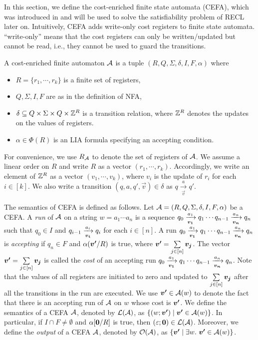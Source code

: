 In this section, we define the cost-enriched finite state automata (CEFA), which was introduced in \cite{atva2020} and will be used to solve the satisfiability problem of RECL later on. 
%
Intuitively, CEFA adds write-only cost registers to finite state automata. ``write-only'' means that the cost registers can only be written/updated but cannot be read, i.e., they cannot be used to guard the transitions. 
%
\begin{definition}
  A cost-enriched finite automaton $\mathcal{A}$ is a tuple $(R, Q, \Sigma, \delta, I, F, \alpha)$ where
  \begin{itemize}
  \item $R = \{r_1, \cdots, r_k\}$ is a finite set of registers, 
    \item $Q, \Sigma, I, F$ are as in the definition of NFA,
    \item $\delta \subseteq Q \times \Sigma \times Q \times \mathbb{Z}^R$ is a transition relation, where $\mathbb{Z}^R$ denotes the updates on the values of registers.
    \item $\alpha \in \Phi(R)$ is an LIA formula specifying an accepting condition.
  \end{itemize}
\end{definition}

For convenience, we use $R_{\mathcal{A}}$ to denote the set of registers of $\mathcal{A}$. We assume a linear order on $R$ and write $R$ as a vector $(r_1, \cdots, r_k)$. Accordingly, we write an element of $\mathbb{Z}^R$ as a vector $(v_1, \cdots, v_k)$, where $v_i$ is the update of $r_i$ for each $i \in [k]$. We also write a transition $(q, a, q', \vec{v}) \in \delta$ as $q \xrightarrow[\vec{v}]{a} q'$.

The semantics of CEFA is defined as follows. Let $\mathcal{A} = (R, Q, \Sigma, \delta, I, F, \alpha)$ be a CEFA. 
A \emph{run} of $\mathcal{A}$ on a string $w = a_1 \cdots a_n$ is a sequence $q_0 \xrightarrow[\myvec{v_1}]{a_1} q_1 \cdots q_{n-1}\xrightarrow[\myvec{v_n}]{a_n} q_n$ such that $q_0 \in I$ and $q_{i-1} \xrightarrow[\myvec{v_i}]{a_i} q_i$ for each $i \in [n]$. A run $q_0 \xrightarrow[\myvec{v_1}]{a_1} q_1 \cdots q_{n-1}\xrightarrow[\myvec{v_n}]{a_n} q_n$ is \emph{accepting} if $q_n \in F$ and $\alpha(\myvec{v'}/R)$ is true, where $\myvec{v'} = \sum \limits_{j \in [n]} \myvec{v_j}$. The vector $\myvec{v'}= \sum \limits_{j \in [n]} \myvec{v_j}$ is called the \emph{cost} of an accepting run $q_0 \xrightarrow[\myvec{v_1}]{a_1} q_1 \cdots q_{n-1}\xrightarrow[\myvec{v_n}]{a_n} q_n$. Note that the values of all registers are initiated to zero and updated to $\sum \limits_{j \in [n]} \myvec{v_j}$ after all the transitions in the run are executed. We use $\myvec{v'} \in \aut(w)$ to denote the fact that there is an accepting run of $\mathcal{A}$ on $w$ whose cost is $\myvec{v'}$.  
We define the semantics of a CEFA $\mathcal{A}$, denoted by $\mathcal{L}(\mathcal{A})$, as $\{(w; \myvec{v'}) \mid  \myvec{v'} \in \aut(w)\}$.  In particular, if $I \cap F \neq \emptyset$ and $\alpha[\myvec{0}/R]$ is true, then $(\varepsilon; \myvec{0}) \in \Lang(\aut)$. Moreover, we define the \emph{output} of a CEFA $\mathcal{A}$, denoted by $\mathcal{O}(\mathcal{A})$, as $\{\myvec{v'} \mid  \exists w.\ \myvec{v'} \in \aut(w)\}$.

